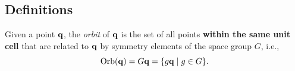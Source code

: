 \documentclass[12pt]{report}
\begin{document}
\subsection{Definitions} \label{subsec:tqc_definitions}


\begin{definition} \label{def:orbit_q}
Given a point \({\vb{q}}\), the \textit{orbit} of \({\vb{q}}\) is the set of all points \textbf{within the same unit cell} that are related to \({\vb{q}}\) by symmetry elements of the space group \(G\), i.e.,
\begin{equation} \label{eq:orbit_of_q}
\text{Orb}({\vb{q}}) = G {\vb{q}} = \{g {\vb{q}} \mid g \in G\}.
\end{equation}
\end{definition}

%
%
\end{document}
